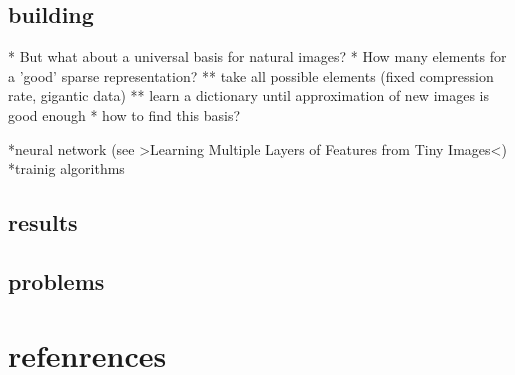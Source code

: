 \subsection{building}
\begin{frame}
* But what about a universal basis for natural images? 
* How many elements for a 'good' sparse representation?
** take all possible elements (fixed compression rate, gigantic data)
** learn a dictionary until approximation of new images is good enough
* how to find this basis?
\end{frame}

\begin{frame}
*neural network (see >Learning Multiple Layers of Features from Tiny Images<)
*trainig algorithms
\end{frame}

\subsection{results}
\begin{frame}
\end{frame}

\subsection{problems}

\section{refenrences}
\begin{frame}


\nocite{}


\end{frame}

